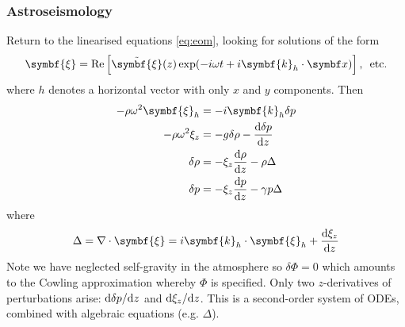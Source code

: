 \documentclass{jknotes}
\newcommand{\disp}{\symbf{\xi}}
\begin{document}
\subsubsection{Astroseismology}
Return to the linearised equations \eqref{eq:eom}, looking for solutions of
the form
\begin{equation}
	\disp = \Re\left[ \tilde{\disp}(z)\exp(-i\omega t + i\symbf{k}_h \cdot
	\x)\right], \,\,\, \text{etc.}
\end{equation}
where $h$ denotes a horizontal vector with only $x$ and $y$ components. Then
\begin{align}
	-\rho \omega^2 \disp_h &= -i\symbf{k}_h \delta p \\
	-\rho \omega^2 \xi_z &= -g \delta \rho - \frac{\diffd \delta p}{\diffd z}
	\\
	\delta \rho &= -\xi_z \frac{\diffd \rho}{\diffd z} - \rho \Delta \\
	\delta p &= -\xi_z \frac{\diffd p}{\diffd z} - \gamma p \Delta
\end{align}
where
\begin{equation}
	\Delta = \nabla \cdot \disp = i\symbf{k}_h \cdot \disp_h + \frac{\diffd
	\xi_z}{\diffd z}
\end{equation}
Note we have neglected self-gravity in the atmosphere so $\delta \Phi = 0$
which amounts to the Cowling approximation whereby $\Phi$ is specified. Only
two $z$-derivatives of perturbations arise: $\diffd \delta p/\diffd z$ and
$\diffd \xi_z / \diffd z$. This is a second-order system of ODEs, combined
with algebraic equations (e.g. $\Delta$).
\end{document}
